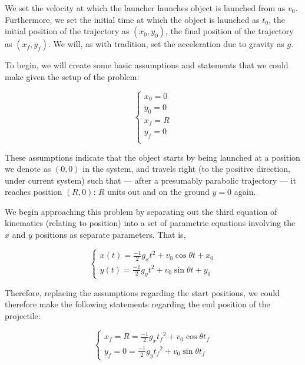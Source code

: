 \documentclass[letterpaper]{article}
\begin{document}
We set the velocity at which the launcher launches object is launched from as \(v_0\). Furthermore, we set the initial time at which the object is launched as \(t_0\), the initial position of the trajectory as \((x_0, y_0)\), the final position of the trajectory as \((x_f,y_f)\). We will, as with tradition, set the acceleration due to gravity as \(g\).

To begin, we will create some basic assumptions and statements that we could make given the setup of the problem:

\begin{equation}
    \begin{cases}
        x_0 = 0 \\
        y_0 = 0 \\
        x_f = R \\
        y_f = 0 \\
    \end{cases}
\end{equation}

These assumptions indicate that the object starts by being launched at a position we denote as \((0,0)\) in the system, and travels right (to the positive direction, under current system) such that --- after a presumably parabolic trajectory --- it reaches position \((R,0)\): \(R\) units out and on the ground \(y=0\) again.

We begin approaching this problem by separating out the third equation of kinematics (relating to position) into a set of parametric equations involving the \(x\) and \(y\) positions as separate parameters. That is,

\begin{equation}
    \begin{cases}
        x(t) = \frac{-1}{2}g_xt^2 + v_0\cos\theta t + x_0 \\
        y(t) = \frac{-1}{2}g_yt^2 + v_0\sin\theta t + y_0 
    \end{cases}
\end{equation}

Therefore, replacing the assumptions regarding the start positions, we could therefore make the following statements regarding the end position of the projectile:

\begin{equation}
    \begin{cases}
        x_f = R = \frac{-1}{2}g_x{t_f}^2 + v_0\cos\theta t_f \\
        y_f = 0 = \frac{-1}{2}g_y{t_f}^2 + v_0\sin\theta t_f
    \end{cases}
\end{equation}
\end{document}
